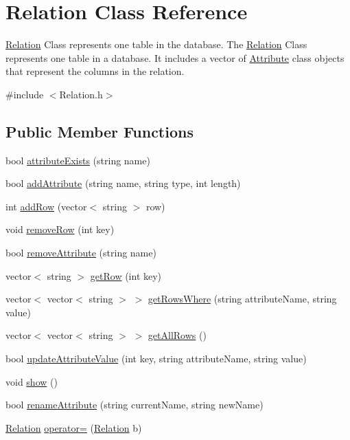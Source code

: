 \hypertarget{class_relation}{\section{Relation Class Reference}
\label{class_relation}
}


\hyperlink{class_relation}{Relation} Class represents one table in the database. The \hyperlink{class_relation}{Relation} Class represents one table in a database. It includes a vector of \hyperlink{class_attribute}{Attribute} class objects that represent the columns in the relation.  




{\ttfamily \#include $<$Relation.\-h$>$}

\subsection*{Public Member Functions}
\begin{DoxyCompactItemize}
\item 
bool \hyperlink{class_relation_a95c3faa21d7bc2eb8a78991dfc059f8c}{attribute\-Exists} (string name)
\item 
bool \hyperlink{class_relation_af4a5da7f3ffe0883b9e253c982cb9d20}{add\-Attribute} (string name, string type, int length)
\item 
int \hyperlink{class_relation_ac863fb3605fac72c0c2a2b9183ae282e}{add\-Row} (vector$<$ string $>$ row)
\item 
void \hyperlink{class_relation_ab8013e49e0d20e1eaab08abe8534f815}{remove\-Row} (int key)
\item 
bool \hyperlink{class_relation_ac2c0d40f65dd8a7f2dd95726afcc3091}{remove\-Attribute} (string name)
\item 
vector$<$ string $>$ \hyperlink{class_relation_a549eddb9c701414f87ea739407c1d56f}{get\-Row} (int key)
\item 
vector$<$ vector$<$ string $>$ $>$ \hyperlink{class_relation_a4eed29fdf5f9427b603e65cdf910b132}{get\-Rows\-Where} (string attribute\-Name, string value)
\item 
vector$<$ vector$<$ string $>$ $>$ \hyperlink{class_relation_ae84c1daafc74ca37b516f1c7814569f8}{get\-All\-Rows} ()
\item 
bool \hyperlink{class_relation_a1a90eddb0ff2c2ec96df70dcbeb2863b}{update\-Attribute\-Value} (int key, string attribute\-Name, string value)
\item 
void \hyperlink{class_relation_a6ae6ba829869995ed0c334e6c4449329}{show} ()
\item 
bool \hyperlink{class_relation_afe7d8ff14a51b47fd8dc4e1a1a069e56}{rename\-Attribute} (string current\-Name, string new\-Name)
\item 
\hyperlink{class_relation}{Relation} \hyperlink{class_relation_a7a5fd377ae34b659a0b388a67e0b41d4}{operator=} (\hyperlink{class_relation}{Relation} b)
\end{DoxyCompactItemize}
